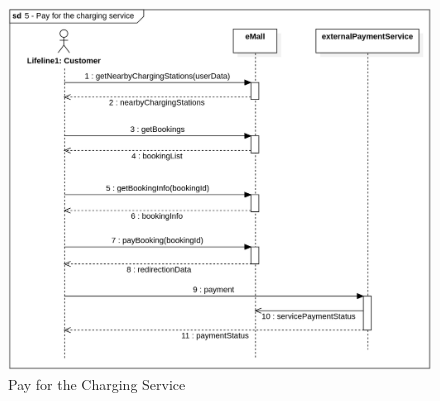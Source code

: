 \begin{figure}[H]
    \begin{center}
        \includegraphics[width=\textwidth]{img/sequence/pay.png}
        \caption{Pay for the Charging Service}
    \end{center}
\end{figure}
